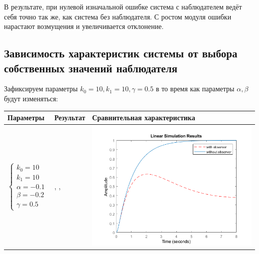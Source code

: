 \FloatBarrier

В результате, при нулевой изначальной ошибке система с наблюдателем ведёт себя точно так же, как система без наблюдателя. С ростом модуля ошибки нарастают возмущения и увеличивается отклонение.

\subsection{Зависимость характеристик системы от выбора собственных значений наблюдателя}

Зафиксируем параметры $k_0=10, k_1=10, \gamma=0.5$  в то время как параметры $\alpha, \beta$ будут изменяться:

\begin{longtable}{ | m{4cm} | m{4cm} | m{8cm} | }
		\hline
		Параметры & Результат & Сравнительная характеристика \\ \hline
		
		$\begin{cases} k_0=10 \\ k_1=10 \\ \alpha=-0.1 \\ \beta= -0.2 \\ \gamma=0.5 \end{cases}$ &
		\text{С наблюдателем:}\linebreak
		\text{$\Omega=0.68$}, \text{$MinRe=0.1$} 
		\text{Без наблюдателя:}\linebreak
		\text{$\Omega=3.27$}, \text{$MinRe=0.97$} & 
		\begin{minipage}{.3\textwidth}
			\includegraphics[scale = 0.46]{images/g1.png}
		\end{minipage}
		\\\hline
		

\end{longtable}
